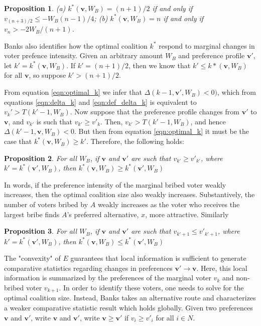 \documentclass[12pt,a4paper]{article}
\newtheorem{proposition}{Proposition}
\begin{document}
\begin{proposition}
    (a) $k^*(\mathbf{v}, W_B) = (n + 1)/2$ if and only if $v_{(n + 3)/2} \leq -W_B(n - 1)/4$; (b) $k^*(\mathbf{v}, W_B) = n$ if and only if $v_n > -2W_B/(n + 1)$.
\end{proposition}

Banks also identifies how the optimal coalition $k^*$ respond to marginal changes in voter prefence intensity. Given an arbitrary amount $W_B$ and preference profile $\mathbf{v}'$, let $k' = k^*(\mathbf{v}, W_B)$. If $k' = (n + 1)/2$, then we know that $k' \leq k*(\mathbf{v}, W_B)$ for all $\mathbf{v}$, so suppose $k' > (n + 1)/2$.

From equation \ref{eqn:optimal_k} we infer that $\Delta(k - 1, \mathbf{v}', W_B) < 0)$, which from equations \ref{eqn:delta_k} and \ref{eqn:def_delta_k} is equivalent to $v_k' > T(k' - 1, W_B)$. Now suppose that the preference profile changes from $\mathbf{v}'$ to $\mathbf{v}$, and $v_{k'}$ is such that $v_{k'} \geq v'_k$. Then, $v_{k'} > T(k' - 1, W_B)$, and hence $\Delta(k' - 1, \mathbf{v}, W_B) < 0$. But then from equation \ref{eqn:optimal_k} it must be the case that $k^*(\mathbf{v}, W_B) \geq k'$. Therefore, the following holds:

\begin{proposition}
    For all $W_B$, if $\mathbf{v}$ and $\mathbf{v}'$ are such that $v_{k'} \geq v'_{k'}$, where $k' = k^*(\mathbf{v}', W_B)$, then $k^*(\mathbf{v}, W_B) \geq k^*(\mathbf{v}', W_B)$
\end{proposition}

In words, if the preference intensity of the marginal bribed voter weakly increases, then the optimal coalition size also weakly increases. Substantively, the number of voters bribed by $A$ weakly increases as the voter who receives the largest bribe finds $A$'s preferred alternative, $x$, more attractive. Similarly

\begin{proposition}
    For all $W_B$, if $\mathbf{v}$ and $\mathbf{v}'$ are such that $v_{k' + 1} \leq v'_{k' + 1}$, where $k' = k^*(\mathbf{v}', W_B)$, then $k^*(\mathbf{v}, W_B) \leq k^*(\mathbf{v}', W_B)$
\end{proposition}

The "convexity" of $E$ guarantees that local information is sufficient to generate comparative statistics regarding changes in preferences $\mathbf{v}' \rightarrow \mathbf{v}$. Here, this local information is summarized by the preferences of the marginal voter $v_k$ and non-bribed voter $v_{k + 1}$. In order to identify these voters, one needs to solve for the optimal coalition size. Instead, Banks takes an alternative route and characterizes a weaker comparative statistic result which holds globally. Given two preferences $\mathbf{v}$ and $\mathbf{v}'$, write $\mathbf{v}$ and $\mathbf{v}'$, write $\mathbf{v} \geq \mathbf{v}'$ if $v_i \geq v'_i$ for all $i \in N$.
\end{document}
